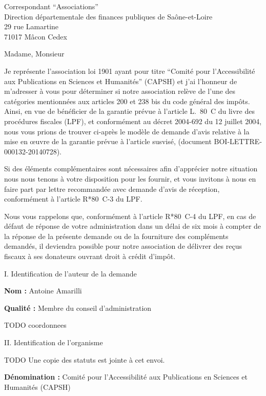 \documentclass[11pt]{lettre}
\makeatletter
\newcommand*{\NoRule}{\renewcommand*{\rule@length}{0}}
\makeatother
\begin{document}
\begin{letter}{Correspondant ``Associations''\\Direction départementale des
  finances publiques de Saône-et-Loire\\29 rue Lamartine\\71017 Mâcon Cedex}
\NoRule
{}
\signature{}
\address{Antoine Amarilli TODO mon adresse}
\nofax
{}
\telephone{}
\email{}
\opening{Madame, Monsieur}

  Je représente l'association loi 1901 ayant pour titre ``Comité pour
  l'Accessibilité aux Publications en Sciences et Humanités'' (CAPSH) et j'ai l'honneur
  de m'adresser à vous pour déterminer si notre association relève de l'une des
  catégories mentionnées aux articles 200 et 238 bis du code général des impôts.
  Ainsi, en vue de bénéficier de la garantie prévue à l'article L.~80~C du
  livre des procédures fiscales (LPF), et conformément au décret 2004-692 du 12
  juillet 2004, nous vous prions de trouver ci-après le modèle de demande d'avis
  relative à la mise en œuvre de la garantie prévue à l'article susvisé,
  (document BOI-LETTRE-000132-20140728).

  Si des éléments complémentaires sont nécessaires afin d'apprécier notre
  situation nous nous tenons à votre disposition pour les
  fournir, et vous invitons à nous en faire part par lettre recommandée avec
  demande d'avis de réception, conformément à l'article R*80~C-3 du LPF.

  Nous vous rappelons que, conformément à l'article R*80~C-4 du LPF, en cas de
  défaut de réponse de votre administration dans un délai de six mois à compter
  de la réponse de la présente demande ou de la fourniture des compléments
  demandés, il deviendra possible pour notre association de délivrer des reçus
  fiscaux à ses donateurs ouvrant droit à crédit d'impôt.

  {\Large I. Identification de l'auteur de la demande}

  \textbf{Nom :} Antoine Amarilli

  \textbf{Qualité :} Membre du conseil d'administration

  TODO coordonnees

  {\Large II. Identification de l'organisme}

  TODO Une copie des statuts est jointe à cet envoi.

  \textbf{Dénomination :} Comité pour l'Accessibilité aux Publications en Sciences
  et Humanités (CAPSH)


\end{letter}
\end{document}
